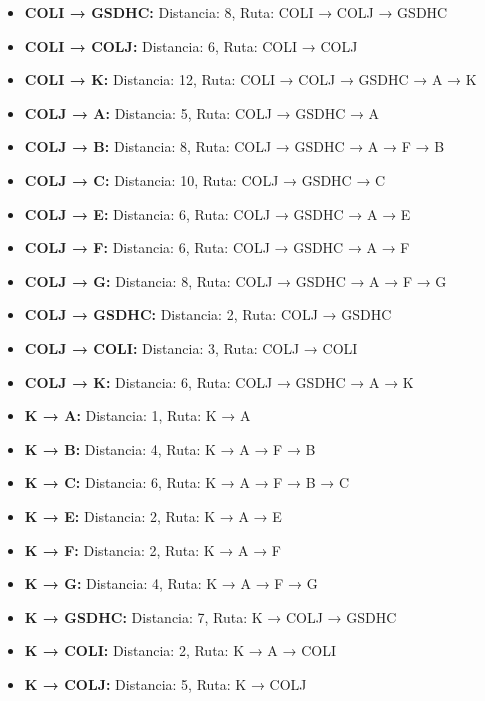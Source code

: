 \documentclass[12pt]{article}
\begin{document}
\begin{itemize}
\item \textbf{COLI → GSDHC:} Distancia: 8, Ruta: COLI → COLJ → GSDHC
\item \textbf{COLI → COLJ:} Distancia: 6, Ruta: COLI → COLJ
\item \textbf{COLI → K:} Distancia: 12, Ruta: COLI → COLJ → GSDHC → A → K
\item \textbf{COLJ → A:} Distancia: 5, Ruta: COLJ → GSDHC → A
\item \textbf{COLJ → B:} Distancia: 8, Ruta: COLJ → GSDHC → A → F → B
\item \textbf{COLJ → C:} Distancia: 10, Ruta: COLJ → GSDHC → C
\item \textbf{COLJ → E:} Distancia: 6, Ruta: COLJ → GSDHC → A → E
\item \textbf{COLJ → F:} Distancia: 6, Ruta: COLJ → GSDHC → A → F
\item \textbf{COLJ → G:} Distancia: 8, Ruta: COLJ → GSDHC → A → F → G
\item \textbf{COLJ → GSDHC:} Distancia: 2, Ruta: COLJ → GSDHC
\item \textbf{COLJ → COLI:} Distancia: 3, Ruta: COLJ → COLI
\item \textbf{COLJ → K:} Distancia: 6, Ruta: COLJ → GSDHC → A → K
\item \textbf{K → A:} Distancia: 1, Ruta: K → A
\item \textbf{K → B:} Distancia: 4, Ruta: K → A → F → B
\item \textbf{K → C:} Distancia: 6, Ruta: K → A → F → B → C
\item \textbf{K → E:} Distancia: 2, Ruta: K → A → E
\item \textbf{K → F:} Distancia: 2, Ruta: K → A → F
\item \textbf{K → G:} Distancia: 4, Ruta: K → A → F → G
\item \textbf{K → GSDHC:} Distancia: 7, Ruta: K → COLJ → GSDHC
\item \textbf{K → COLI:} Distancia: 2, Ruta: K → A → COLI
\item \textbf{K → COLJ:} Distancia: 5, Ruta: K → COLJ
\end{itemize}
\end{document}
